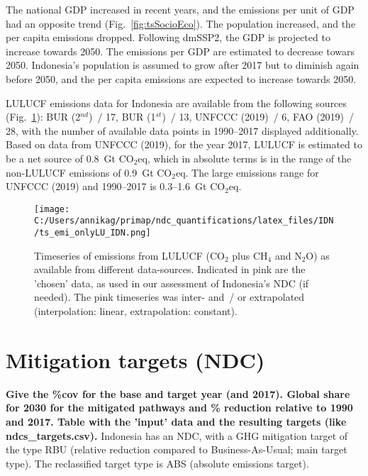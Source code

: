 \documentclass[12pt]{article}
\begin{document}
 The national GDP increased in recent years, and the emissions per unit of GDP had an opposite trend (Fig.~\ref{fig:tsSocioEco}).
 The population increased, and the per capita emissions dropped. 
 Following dmSSP2, the GDP is projected to increase towards 2050. 
 The emissions per GDP are estimated to decrease towars 2050. 
 Indonesia's population is assumed to grow after 2017 but to diminish again before 2050, and the per capita emissions are expected to increase towards 2050. 

 LULUCF emissions data for Indonesia are available from the following sources (Fig.~\ref{fig:tsLULUCF}): BUR (2$^{nd}$)~/ 17, BUR (1$^{st}$)~/ 13, UNFCCC (2019)~/ 6, FAO (2019)~/ 28, with the number of available data points in 1990--2017 displayed additionally.
 Based on data from UNFCCC (2019), for the year 2017, LULUCF is estimated to be a net source of 0.8~Gt CO$_2$eq, which in absolute terms is in the range of the non-LULUCF emissions of 0.9~Gt CO$_2$eq.
 The large emissions range for UNFCCC (2019) and 1990--2017 is 0.3--1.6~Gt CO$_2$eq.

 \begin{figure}[H]
 \centering
 \texttt{[image: C:/Users/annikag/primap/ndc\_quantifications/latex\_files/IDN/ts\_emi\_onlyLU\_IDN.png]}
 \caption{Timeseries of emissions from LULUCF (CO$_2$ plus CH$_4$ and N$_2$O) as available from different data-sources. 
 Indicated in pink are the 'chosen' data, as used in our assessment of Indonesia's NDC (if needed). 
 The pink timeseries was inter- and~/ or extrapolated (interpolation: linear, extrapolation: constant).}
 \label{fig:tsLULUCF}
 \end{figure}

 \newpage %
 \section{Mitigation targets (NDC)}
 \label{sec:mitiTars}

 \textbf{ 
 Give the \%cov for the base and target year (and 2017). \newline
 Global share for 2030 for the mitigated pathways and \% reduction relative to 1990 and 2017. \newline
 Table with the 'input' data and the resulting targets (like ndcs\_targets.csv). \newline}
 Indonesia has an NDC, with a GHG mitigation target of the type RBU (relative reduction compared to Business-As-Usual; main target type).
 The reclassified target type is ABS (absolute emissions target).
\end{document}
